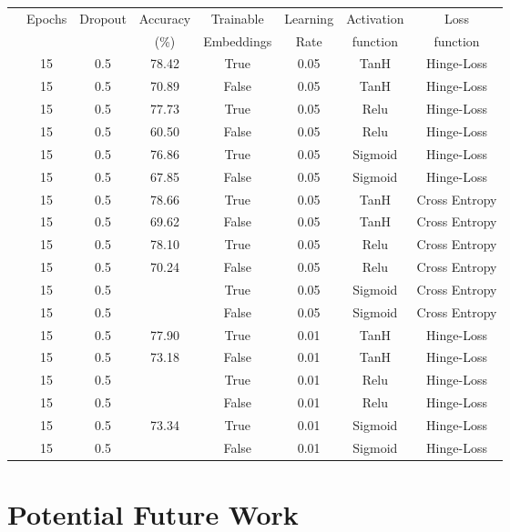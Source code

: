 \documentclass[a0,landscape]{a0poster}
\begin{document}
\begin{multicols}{3}
\begin{tabular}{c | c |c | c | c | c | c | c }
	& Epochs & Dropout & Accuracy & Trainable & Learning & Activation & Loss \\
	& & &  (\%) & Embeddings & Rate & function & function\\
	\hline
	\hline
	{\multirow{12}{*}{\centering \rotatebox[origin=c]{90}{Lexical}}} & 15 & 0.5 & 78.42 & True & 0.05 & TanH & Hinge-Loss\\
	& 15 & 0.5 & 70.89 & False & 0.05 & TanH & Hinge-Loss\\
	& 15 & 0.5 & 77.73 & True & 0.05 & Relu & Hinge-Loss\\
	& 15 & 0.5 & 60.50 & False & 0.05 & Relu & Hinge-Loss\\
	& 15 & 0.5 & 76.86 & True & 0.05 & Sigmoid & Hinge-Loss\\
	& 15 & 0.5 & 67.85 & False & 0.05 & Sigmoid & Hinge-Loss\\
	& 15 & 0.5 & 78.66 & True & 0.05 & TanH & Cross Entropy\\
	& 15 & 0.5 & 69.62 & False & 0.05 & TanH & Cross Entropy\\
	& 15 & 0.5 & 78.10 & True & 0.05 & Relu & Cross Entropy\\
	& 15 & 0.5 & 70.24 & False & 0.05 & Relu & Cross Entropy\\
	& 15 & 0.5 &  & True & 0.05 & Sigmoid & Cross Entropy\\
	& 15 & 0.5 &  & False & 0.05 & Sigmoid & Cross Entropy\\
		
	\hline
	\hline
	{\multirow{6}{*}{\rotatebox[origin=c]{90}{Acolex}}} & 15 & 0.5 & 77.90 & True & 0.01 & TanH & Hinge-Loss\\
	& 15 & 0.5 & 73.18 & False & 0.01 & TanH & Hinge-Loss\\
	& 15 & 0.5 &  & True & 0.01 & Relu & Hinge-Loss\\
	& 15 & 0.5 &  & False & 0.01 & Relu & Hinge-Loss\\
	& 15 & 0.5 & 73.34 & True & 0.01 & Sigmoid & Hinge-Loss\\
	& 15 & 0.5 &  & False & 0.01 & Sigmoid & Hinge-Loss\\

\end{tabular}

\section*{Potential Future Work}


\end{multicols}
\end{document}
